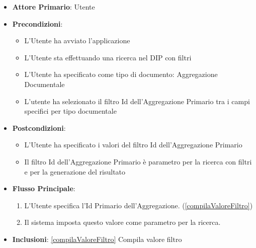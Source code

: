 \begin{itemize}
      \item \textbf{Attore Primario}: Utente
      \item \textbf{Precondizioni}: 
      \begin{itemize}
            \item L'Utente ha avviato l'applicazione
            \item L'Utente sta effettuando una ricerca nel DIP con filtri
            \item L'Utente ha specificato come tipo di documento: Aggregazione Documentale
            \item L'utente ha selezionato il filtro Id dell'Aggregazione Primario tra i campi specifici per tipo documentale
      \end{itemize}
      \item \textbf{Postcondizioni}: \begin{itemize}
            \item L'Utente ha specificato i valori del filtro Id dell'Aggregazione Primario
            \item Il filtro Id dell'Aggregazione Primario è parametro per la ricerca con filtri e per la generazione del risultato
      \end{itemize}
      \item \textbf{Flusso Principale}:
            \begin{enumerate}
                  \item L'Utente specifica l'Id Primario dell'Aggregazione. (\ref{compilaValoreFiltro})
                  \item Il sistema imposta questo valore come parametro per la ricerca.
            \end{enumerate}
      \item \textbf{Inclusioni}: \ref{compilaValoreFiltro} Compila valore filtro
\end{itemize}

